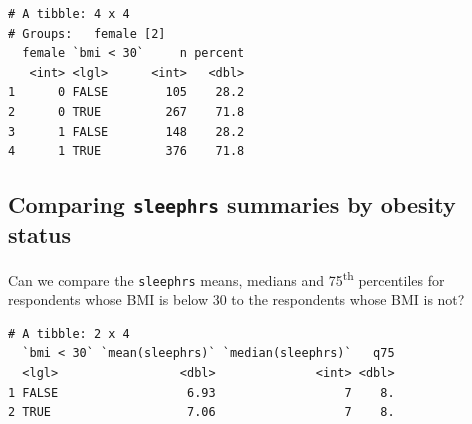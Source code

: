 \documentclass[]{book}
\newenvironment{Shaded}{\begin{snugshade}}{\end{snugshade}}
\newcommand{\KeywordTok}[1]{\textcolor[rgb]{0.13,0.29,0.53}{\textbf{#1}}}
\newcommand{\DataTypeTok}[1]{\textcolor[rgb]{0.13,0.29,0.53}{#1}}
\newcommand{\DecValTok}[1]{\textcolor[rgb]{0.00,0.00,0.81}{#1}}
\newcommand{\FloatTok}[1]{\textcolor[rgb]{0.00,0.00,0.81}{#1}}
\newcommand{\StringTok}[1]{\textcolor[rgb]{0.31,0.60,0.02}{#1}}
\newcommand{\OperatorTok}[1]{\textcolor[rgb]{0.81,0.36,0.00}{\textbf{#1}}}
\newcommand{\NormalTok}[1]{#1}
\theoremstyle{definition}
\theoremstyle{definition}
\theoremstyle{definition}
\theoremstyle{remark}
\begin{document}
\begin{Shaded}
\end{Shaded}

\begin{verbatim}
# A tibble: 4 x 4
# Groups:   female [2]
  female `bmi < 30`     n percent
   <int> <lgl>      <int>   <dbl>
1      0 FALSE        105    28.2
2      0 TRUE         267    71.8
3      1 FALSE        148    28.2
4      1 TRUE         376    71.8
\end{verbatim}

\subsection{\texorpdfstring{Comparing \texttt{sleephrs} summaries by
obesity
status}{Comparing sleephrs summaries by obesity status}}\label{comparing-sleephrs-summaries-by-obesity-status}

Can we compare the \texttt{sleephrs} means, medians and
75\textsuperscript{th} percentiles for respondents whose BMI is below 30
to the respondents whose BMI is not?

\begin{Shaded}
\end{Shaded}

\begin{verbatim}
# A tibble: 2 x 4
  `bmi < 30` `mean(sleephrs)` `median(sleephrs)`   q75
  <lgl>                 <dbl>              <int> <dbl>
1 FALSE                  6.93                  7    8.
2 TRUE                   7.06                  7    8.
\end{verbatim}
\end{document}
